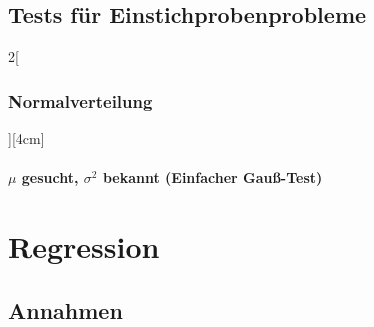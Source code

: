 \documentclass[8pt]{extarticle}
\begin{document}
\subsection{Tests für Einstichprobenprobleme}

\begin{multicols}{2}[\subsubsection{Normalverteilung}][4cm]

  \paragraph{ $\mu$ gesucht, $\sigma^2 $ bekannt (Einfacher Gauß-Test)}
  


\end{multicols}




\section{Regression}

\subsection{Annahmen}
\end{document}
